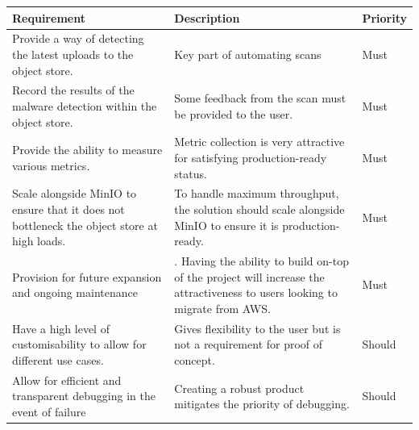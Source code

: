 \documentclass[12pt, conference, final, a4paper, onecolumn, compsoc]{IEEEtran}
\begin{document}
\begin{table}[H] \centering
  \begin{tabular}{|p{}|p{}|l|} \hline
    \textbf{Requirement} & \textbf{Description} & \textbf{Priority} \\ \hline
    Provide a way of detecting the latest uploads to the object store. & Key part
    of automating scans & Must \\ \hline Record the results of the malware
    detection within the object store. & Some feedback from the scan must be
    provided to the user. & Must \\ \hline Provide the ability to measure
    various metrics. & Metric
                      collection is very attractive for satisfying production-ready status. & Must \\
    \hline Scale alongside MinIO to ensure that it does not bottleneck the
    object store at high loads. & To handle maximum throughput, the solution
                                 should scale alongside MinIO to ensure it is
                                 production-ready. & Must \\ \hline Provision
    for future expansion and ongoing maintenance &. Having the ability to build
                                                   on-top of the project will
                                                   increase the attractiveness
                                                   to users looking to migrate
                                                   from AWS. & Must \\ \hline
    \hline

    Have a high level of customisability to allow for different use cases. &
                                                                            Gives flexibility to the user but is not a requirement for proof of concept. &
                                                                                                                                                          Should \\ \hline Allow for efficient and transparent debugging in the event of
    failure & Creating a robust product mitigates the priority of debugging. &
                                                                               Should \\ \hline


\end{tabular}
\end{table}
\end{document}
